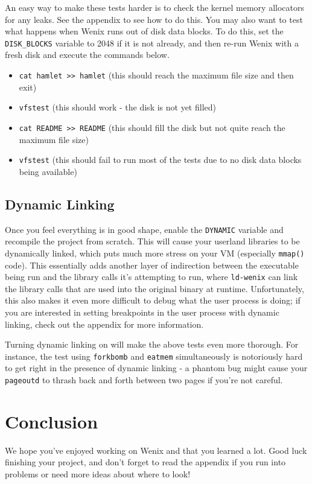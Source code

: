 An easy way to make these tests harder is to check the kernel memory allocators for any leaks. See the  appendix to see how to do this. You may also want to test what happens when Wenix runs out of disk data blocks. To do this, set the \texttt{DISK\_BLOCKS} variable to 2048 if it is not already, and then re-run Wenix with a fresh disk and execute the commands below.

\begin{itemize}
    \item \texttt{cat hamlet >> hamlet} (this should reach the maximum file size and then exit)
    \item \texttt{vfstest} (this should work - the disk is not yet filled)
    \item \texttt{cat README >> README} (this should fill the disk but not quite reach the maximum file size)
    \item \texttt{vfstest} (this should fail to run most of the tests due to no disk data blocks being available)
\end{itemize}

\subsection{Dynamic Linking}

Once you feel everything is in good shape, enable the \texttt{DYNAMIC} variable and recompile the project from scratch. This will cause your userland libraries to be dynamically linked, which puts much more stress on your VM (especially \texttt{mmap()} code). This essentially adds another layer of indirection between the executable being run and the library calls it's attempting to run, where \texttt{ld-wenix} can link the library calls that are used into the original binary at runtime. Unfortunately, this also makes it even more difficult to debug what the user process is doing; if you are interested in setting breakpoints in the user process with dynamic linking, check out the  appendix for more information.

Turning dynamic linking on will make the above tests even more thorough. For instance, the test using \texttt{forkbomb} and \texttt{eatmem} simultaneously is notoriously hard to get right in the presence of dynamic linking - a phantom bug might cause your \texttt{pageoutd} to thrash back and forth between two pages if you're not careful.

\section{Conclusion}

We hope you've enjoyed working on Wenix and that you learned a lot. Good luck finishing your project, and don't forget to read the  appendix if you run into problems or need more ideas about where to look!
